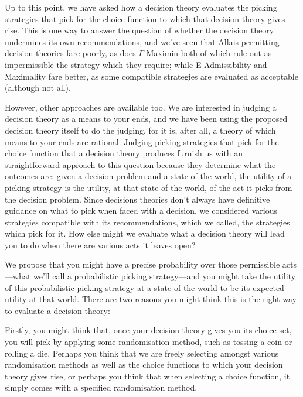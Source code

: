 \documentclass[a4paper]{article}
\newcommand{\todoinfo}[2][]{\todo[backgroundcolor=orange!80,bordercolor=black,linecolor=gray!80, #1,inline,caption={}]{#2}}
\newenvironment{CCM rewritten}
{\begingroup\color{blue}} %
{\endgroup}              %
\begin{document}
Up to this point, we have asked how a decision theory evaluates the picking strategies that pick for the choice function to which that decision theory gives rise. This is one way to answer the question of whether the decision theory undermines its own recommendations, and we've seen that Allais-permitting decision theories fare poorly, as does $\Gamma$-Maximin both of which rule out as impermissible the strategy which they require; while E-Admissibility and Maximality fare better, as some compatible strategies are evaluated as acceptable (although not all). 

However, other approaches are available too. We are interested in judging a decision theory as a means to your ends, and we have been using the proposed decision theory itself to do the judging, for it is, after all, a theory of which means to your ends are rational. Judging picking strategies that pick for the choice function that a decision theory produces furnish us with an straightforward approach to this question because they determine what the outcomes are: given a decision problem and a state of the world, the utility of a picking strategy is the utility, at that state of the world, of the act it picks from the decision problem. Since decisions theories don't always have definitive guidance on what to pick when faced with a decision, we considered various strategies compatible with its recommendations, which we called, the strategies which pick for it. 
How else might we evaluate what a decision theory will lead you to do when there are various acts it leaves open?

We propose that you might have a precise probability over those permissible acts---what we'll call a probabilistic picking strategy---and you might take the utility of this probabilistic picking strategy at a state of the world to be its expected utility at that world. There are two reasons you might think this is the right way to evaluate a decision theory: 

Firstly, you might think that, once your decision theory gives you its choice set, you will pick by applying some randomisation method, such as tossing a coin or rolling a die. Perhaps you think that we are freely selecting amongst various randomisation methods as well as the choice functions to which your decision theory gives rise, or perhaps you think that when selecting a choice function, it simply comes with a specified randomisation method. %
\end{document}

